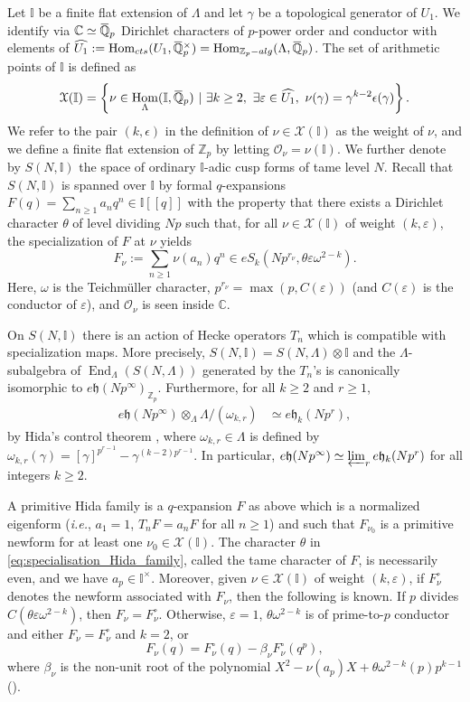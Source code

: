 \documentclass[12pt]{amsart}
\newcommand\bI{\mathbb{I}}
\newcommand\bC{\mathbb{C}}
\newcommand\bQ{\mathbb{Q}}
\newcommand\Zp{{\mathbb{Z}_p}}
\newcommand\cO{\mathcal{O}}
\newcommand\cX{\mathcal{X}}
\newcommand\gh{\mathfrak{h}}
\newcommand{\ob}[1]{\mkern 1.5mu\overline{\mkern-1.5mu#1\mkern-1.5mu}\mkern 1.5mu}
\DeclareMathOperator{\Hom}{Hom}
\DeclareMathOperator{\End}{End}
\theoremstyle{defstyle}
\theoremstyle{thmstyle}
\begin{document}
Let $\bI$ be a finite flat extension of $\Lambda$ and let $\gamma$ be a topological generator of $U_1$. We identify via $\bC\simeq \ob{\bQ}_p$ Dirichlet characters of $p$-power order and conductor with elements of $\widehat{U_1}:=\Hom_{\textrm{cts}}(U_1,\ob{\bQ}_p^\times)=\Hom_{\Zp-\textrm{alg}}(\Lambda,\ob{\bQ}_p)$. The set of arithmetic points of $\bI$ is defined as 
\[\cX(\bI)=\left\{ \nu\in\Hom_{\Lambda}(\bI,\ob{\bQ}_p) \ | \ \exists k\geq 2, \ \exists \varepsilon\in \widehat{U_1},\ \nu(\gamma)=\gamma^{k-2}\epsilon(\gamma) \right\}.\]
We refer to the pair $(k,\epsilon)$ in the definition of $\nu\in\cX(\bI)$ as the weight of $\nu$, and we define a finite flat extension of $\Zp$ by letting $\cO_\nu=\nu(\bI)$. We further denote by $S(N,\bI)$ the space of ordinary $\bI$-adic cusp forms of tame level $N$. Recall that $S(N,\bI)$ is spanned over $\bI$ by formal $q$-expansions $F(q)=\sum_{n\geq 1} a_nq^n\in\bI[[q]]$ with the property that there exists a Dirichlet character $\theta$ of level dividing $Np$ such that, for all $\nu\in\cX(\bI)$ of weight $(k,\varepsilon)$, the specialization of $F$ at $\nu$ yields
\begin{equation}\label{eq:specialisation_Hida_family}
	F_\nu:=\sum_{n\geq 1} \nu(a_n)q^n\in e S_k(Np^{r_\nu},\theta\varepsilon\omega^{2-k}). 
\end{equation}
Here, $\omega$ is the Teichmüller character, $p^{r_\nu}=\max(p,C(\varepsilon))$ (and $C(\varepsilon)$ is the conductor of $\varepsilon$), and $\cO_\nu$ is seen inside $\bC$. 

On $S(N,\bI)$ there is an action of Hecke operators $T_n$ which is compatible with specialization maps. More precisely, $S(N,\bI)=S(N,\Lambda)\otimes \bI$ and the $\Lambda$-subalgebra of $\End_\Lambda(S(N,\Lambda))$ generated by the $T_n$'s is canonically isomorphic to $e\gh(Np^\infty)_{\Zp}$. Furthermore, for all $k\geq 2$ and $r\geq 1$, 
\begin{align*}
	e\gh(Np^\infty) \otimes_{\Lambda} \Lambda/(\omega_{k,r}) &\simeq e\gh_k(Np^r),
\end{align*}
by Hida's control theorem \cite[Thm. 1.2]{hida1986galois}, where $\omega_{k,r}\in\Lambda$ is defined by $\omega_{k,r}(\gamma)=[\gamma]^{p^{r-1}}-\gamma^{(k-2)p^{r-1}}$. In particular, $e\gh(Np^\infty) \simeq \varprojlim_r e\gh_k(Np^r)$ for all integers $k\geq 2$.

A primitive Hida family is a $q$-expansion $F$ as above which is a normalized eigenform (\textit{i.e.}, $a_1=1$, $T_nF=a_nF$ for all $n\geq 1$) and such that $F_{\nu_0}$ is a primitive newform for at least one $\nu_0\in \cX(\bI)$. The character $\theta$ in \eqref{eq:specialisation_Hida_family}, called the tame character of $F$, is necessarily even, and we have $a_p\in \bI^\times$. Moreover, given $\nu\in\cX(\bI)$ of weight $(k,\varepsilon)$, if $F_\nu^\circ$ denotes the newform associated with $F_\nu$, then the following is known. If $p$ divides $C(\theta\varepsilon\omega^{2-k})$, then $F_\nu=F_\nu^\circ$. Otherwise, $\varepsilon=1$, $\theta\omega^{2-k}$ is of prime-to-$p$ conductor and either $F_\nu=F_\nu^\circ$ and $k=2$, or 
\[F_\nu(q)=F_\nu^\circ(q)-\beta_\nu F_\nu^\circ(q^p),\]
where $\beta_\nu$ is the non-unit root of the polynomial $X^2-\nu(a_p)X+\theta\omega^{2-k}(p)p^{k-1}$ (\cite[Thm. 4.1]{hidaAIF}).
\end{document}
